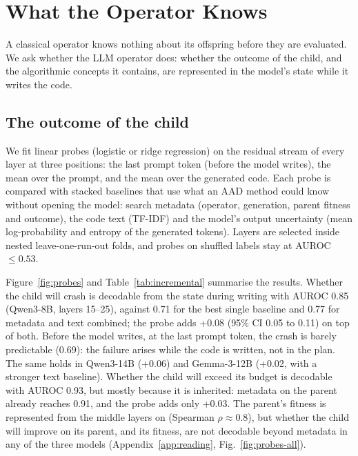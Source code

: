 \section{What the Operator Knows}\label{sec:reading}

A classical operator knows nothing about its offspring before they are
evaluated. We ask whether the LLM operator does: whether the outcome of
the child, and the algorithmic concepts it contains, are represented in
the model's state while it writes the code.

\subsection{The outcome of the child}
We fit linear probes (logistic or ridge regression) on the residual
stream of every layer at three positions: the last prompt token (before
the model writes), the mean over the prompt, and the mean over the
generated code. Each probe is compared with stacked baselines that use
what an AAD method could know without opening the model: search
metadata (operator, generation, parent fitness and outcome), the code
text (TF-IDF) and the model's output uncertainty (mean log-probability
and entropy of the generated tokens). Layers are selected inside nested
leave-one-run-out folds, and probes on shuffled labels stay at AUROC
$\le0.53$.

Figure~\ref{fig:probes} and Table~\ref{tab:incremental} summarise the
results. Whether the child will crash is decodable from the state
during writing with AUROC 0.85 (Qwen3-8B, layers 15--25), against 0.71
for the best single baseline and 0.77 for metadata and text combined;
the probe adds +0.08 (95\% CI 0.05 to 0.11) on top of both. Before the
model writes, at the last prompt token, the crash is barely predictable
(0.69): the failure arises while the code is written, not in the plan.
The same holds in Qwen3-14B (+0.06) and Gemma-3-12B (+0.02, with a
stronger text baseline). Whether the child will exceed its budget is
decodable with AUROC 0.93, but mostly because it is inherited: metadata
on the parent already reaches 0.91, and the probe adds only +0.03. The
parent's fitness is represented from the middle layers on (Spearman
$\rho\approx0.8$), but whether the child will improve on its parent, and
its fitness, are not decodable beyond metadata in any of the three
models (Appendix~\ref{app:reading}, Fig.~\ref{fig:probes-all}).

